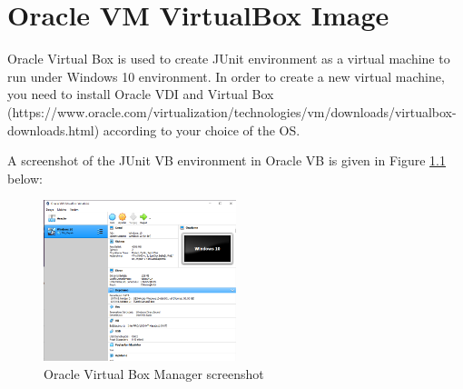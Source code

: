 \chapter{Oracle VM VirtualBox Image}
\label{ch:appendix-ovb-image}
Oracle Virtual Box is used to create JUnit environment as a virtual machine to run under Windows 10 environment.  In order to create a new virtual machine, you need to install Oracle VDI and Virtual Box (https://www.oracle.com/virtualization/technologies/vm/downloads/virtualbox-downloads.html) according to your choice of the OS. 

A screenshot of the JUnit VB environment in Oracle VB is given in Figure \ref{fig:oracleVB} below:
\begin{figure}[H]
    \centering
    \includegraphics[width=0.5\textwidth]{images/oracleVB.png}
    \caption{Oracle Virtual Box Manager screenshot}
    \label{fig:oracleVB}
\end{figure}